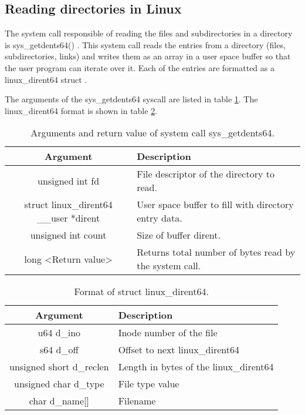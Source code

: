 \subsection{Reading directories in Linux}
The system call responsible of reading the files and subdirectories in a directory is sys\_getdents64() \cite{code_kernel_getdents64}. This system call reads the entries from a directory (files, subdirectories, links) and writes them as an array in a user space buffer so that the user program can iterate over it. Each of the entries are formatted as a linux\_dirent64 struct \cite{getdents_man} \cite{code_kernel_linux_dirent64}. 

The arguments of the sys\_getdents64 syscall are listed in table \ref{table:getdents_args}. The linux\_dirent64 format is shown in table \ref{table:linux_dirent64}.

\begin{table}[htbp]
\begin{tabular}{|c|>{\centering\arraybackslash}p{7cm}|}
\hline
\textbf{Argument} & \textbf{Description} \\
\hline
\hline
unsigned int fd & File descriptor of the directory to read.\\
\hline
struct linux\_dirent64 \_\_user *dirent & User space buffer to fill with directory entry data.\\
\hline
unsigned int count & Size of buffer dirent.\\
\hline
long <Return value> & Returns total number of bytes read by the system call.\\
\hline
\end{tabular}
\caption{Arguments and return value of system call sys\_getdents64.}
\label{table:getdents_args}
\end{table}

\begin{table}[htbp]
\begin{tabular}{|c|>{\centering\arraybackslash}p{7cm}|}
\hline
\textbf{Argument} & \textbf{Description} \\
\hline
\hline
u64 d\_ino & Inode number of the file\\
\hline
s64 d\_off & Offset to next linux\_dirent64\\
\hline
unsigned short d\_reclen & Length in bytes of the linux\_dirent64\\
\hline
unsigned char d\_type & File type value\\
\hline
char d\_name[] & Filename\\
\hline
\end{tabular}
\caption{Format of struct linux\_dirent64.}
\label{table:linux_dirent64}
\end{table}

